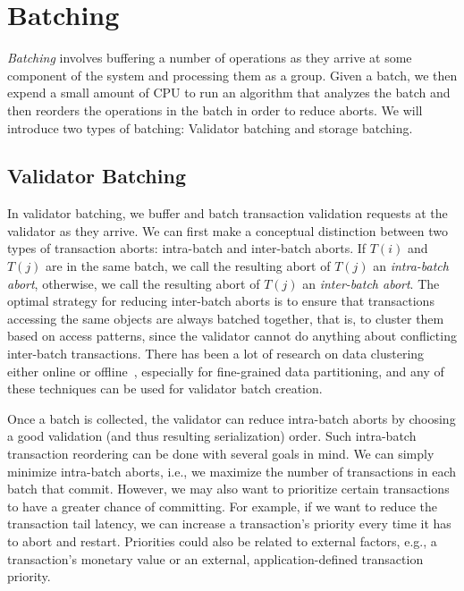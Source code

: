 \section{Batching}\label{sec:overview}


\emph{Batching} involves buffering a number of operations as they arrive at some component of the system and processing them as a group. 
Given a batch, we then expend a small amount of CPU to run an algorithm that analyzes the batch and then reorders the operations in the batch in order to reduce aborts. We will introduce two types of batching: Validator batching and storage batching.


\subsection{Validator Batching}\label{subsec:overview:validator}

In validator batching, we buffer and batch transaction validation requests at the validator as they arrive.
We can first make a conceptual distinction between two types of transaction aborts: intra-batch and inter-batch aborts. If $T(i)$ and $T(j)$ are in the same batch, we call the resulting abort of $T(j)$ an \emph{intra-batch abort}, otherwise, we call the resulting abort of $T(j)$ an \emph{inter-batch abort}.
The optimal strategy for reducing inter-batch aborts is to ensure that transactions accessing the same objects are always batched together, that is, to cluster them based on access patterns, since  the validator cannot do anything about conflicting inter-batch transactions. 
There has been a lot of research on data clustering either online or offline~\cite{elmore2015squall, pavlo2012skew}, especially for fine-grained data partitioning, and any of these techniques can be used for validator batch creation.

Once a batch is collected, the validator can reduce intra-batch aborts by choosing a good validation (and thus resulting serialization) order.
Such intra-batch transaction reordering can be done with several goals in mind. We can simply minimize intra-batch aborts, i.e., we maximize the number of transactions in each batch that commit. However, we may also want to prioritize certain transactions to have a greater chance of committing. For example, if we want to reduce the transaction tail latency, we can increase a transaction's priority every time it has to abort and restart. Priorities could also be related to external factors, e.g., a transaction's monetary value or an external, application-defined transaction priority. 

